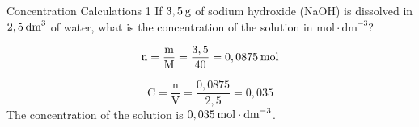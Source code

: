       \begin{wex}{ Concentration Calculations 1 }
{
      \label{m38712*probfhsst!!!underscore!!!id1654}
      \label{m38712*id283003}If $3,5\phantom{\rule{2pt}{0ex}}\text{g}$ of sodium hydroxide (NaOH) is dissolved in $2,5\phantom{\rule{2pt}{0ex}}{\text{dm}}^{3}$ of water, what is the concentration of the solution in $\text{mol}\ensuremath{\cdot}{\text{dm}}^{-3}$? 
      \vspace{5pt}}
{
      \label{m38712*id283067}\nopagebreak\noindent{}
    \begin{equation*}
    \text{n}=\frac{\text{m}}{\text{M}}=\frac{3,5}{40}=0,0875\phantom{\rule{2pt}{0ex}}\text{mol}
      \end{equation*}
      \label{m38712*id283121}\nopagebreak\noindent{}
        
    \begin{equation*}
    \text{C}=\frac{\text{n}}{\text{V}}=\frac{0,0875}{2,5}=0,035
      \end{equation*}
      \label{m38712*id283169}The concentration of the solution is $0,035\phantom{\rule{2pt}{0ex}}\text{mol}\ensuremath{\cdot}{\text{dm}}^{-3}$.
 
}
    \end{wex}

    \noindent
\par
\vspace{-2cm} 

